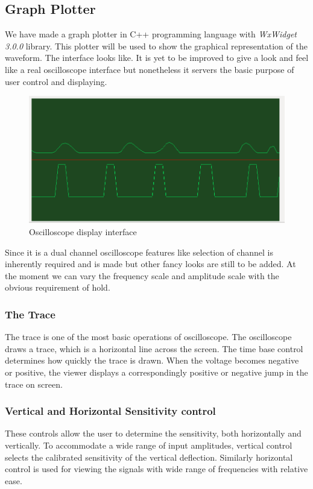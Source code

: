 \documentclass[12pt,a4paper]{article}
\begin{document}
\subsection{Graph Plotter}
We have made a graph plotter in C++ programming language with \textit{WxWidget 3.0.0} library. This plotter will be used to show the graphical representation of the waveform. The interface looks like. It is yet to be improved to give a look and feel like a real oscilloscope interface but nonetheless it servers the basic purpose of user control and displaying.
\begin{figure}[hbtp]
	\centering
	\includegraphics[scale=.4]{Images/DualChannel.png}
	\caption{Oscilloscope display interface}
\end{figure}
Since it is a dual channel oscilloscope features like selection of channel is inherently required and is made but other fancy looks are still to be added. At the moment we can vary the frequency scale and amplitude scale with the obvious requirement of hold.


\subsubsection{The Trace}
The trace is one of the most basic operations of oscilloscope. The oscilloscope draws a trace, which is a horizontal line across the screen. The time base control determines how quickly the trace is drawn. When the voltage becomes negative or positive, the viewer displays a correspondingly positive or negative jump in the trace on screen.

\subsubsection{Vertical and Horizontal Sensitivity control}


These controls allow the user to determine the sensitivity, both horizontally and vertically. To accommodate a wide range of input amplitudes, vertical control selects the calibrated sensitivity of the vertical deflection. Similarly horizontal control is used for viewing the signals with wide range of frequencies with relative ease.
\end{document}
